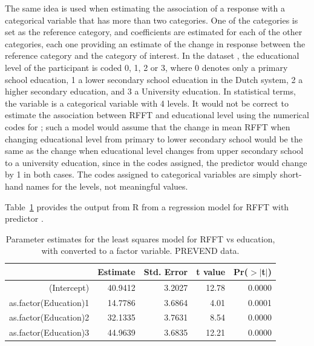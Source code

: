 The same idea is used when estimating the association of a response with a categorical variable that has more than two categories.  One of the categories is set as the reference category, and coefficients are estimated for each of the other categories, each one providing an estimate of the change in response between the reference category and the category of interest.  In the dataset , the educational level of the participant is coded 0, 1, 2 or 3, where 0 denotes only a primary school education, 1 a lower secondary school education in the Dutch system, 2 a higher secondary education, and 3 a University education.   In statistical terms, the variable  is a categorical variable with 4 levels.  It would not be correct to estimate the association between RFFT and educational level using the numerical codes for ; such a model would assume that the change in mean RFFT when changing educational level from primary to lower secondary school would be the same as the change when educational level changes from upper secondary school to a university education, since in the codes assigned, the predictor would change by 1 in both cases.  The codes assigned to categorical variables are simply short-hand names for the levels, not meaningful values.  

Table~\ref{RFFTEducationRegression} provides the output from \textsf{R} from a regression model for RFFT with predictor .  

\begin{table}[ht]
\centering
\begin{tabular}{rrrrr}
  \hline
 & Estimate & Std. Error & t value & Pr($>$$|$t$|$) \\ 
  \hline
(Intercept) & 40.9412 & 3.2027 & 12.78 & 0.0000 \\ 
  as.factor(Education)1 & 14.7786 & 3.6864 & 4.01 & 0.0001 \\ 
  as.factor(Education)2 & 32.1335 & 3.7631 & 8.54 & 0.0000 \\ 
  as.factor(Education)3 & 44.9639 & 3.6835 & 12.21 & 0.0000 \\ 
   \hline
\end{tabular}
\caption{Parameter estimates for the least squares model for RFFT vs education, with  converted to a factor variable. PREVEND data.}
\label{RFFTEducationRegression}
\end{table}

